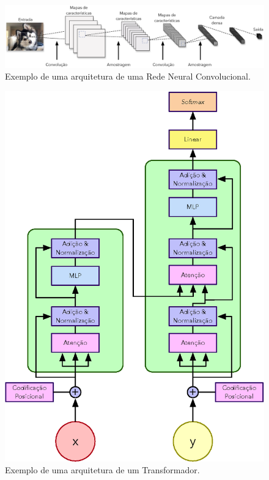 \begin{frame}
	\begin{figure}
		\centering
		\includegraphics[scale=0.275]{figs/cnn.eps}	
		\caption{Exemplo de uma arquitetura de uma Rede Neural Convolucional.}
		\label{f.cnn}
	\end{figure}
\end{frame}

\begin{frame}
	\begin{figure}
		\centering
		\includegraphics[scale=0.425]{figs/transformer.eps}	
		\caption{Exemplo de uma arquitetura de um Transformador.}
		\label{f.transformer}
	\end{figure}
\end{frame}